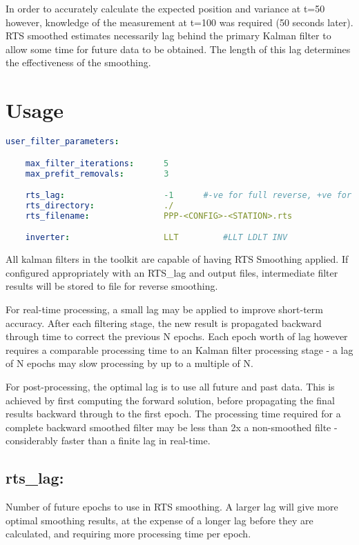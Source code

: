 In order to accurately calculate the expected position and variance at t=50 however, knowledge of the measurement at t=100 was required (50 seconds later). RTS smoothed estimates necessarily lag behind the primary Kalman filter to allow some time for future data to be obtained. The length of this lag determines the effectiveness of the smoothing.

\section{Usage}

\begin{lstlisting}[language=yaml,caption=RTS Configuration]
user_filter_parameters:

    max_filter_iterations:      5
    max_prefit_removals:        3

    rts_lag:                    -1      #-ve for full reverse, +ve for limited epochs
    rts_directory:              ./
    rts_filename:               PPP-<CONFIG>-<STATION>.rts

    inverter:                   LLT         #LLT LDLT INV

\end{lstlisting}

All kalman filters in the toolkit are capable of having RTS Smoothing applied. If configured appropriately with an RTS\_lag and output files, intermediate filter results will be stored to file for reverse smoothing.

For real-time processing, a small lag may be applied to improve short-term accuracy. After each filtering stage, the new result is propagated backward through time to correct the previous N epochs. Each epoch worth of lag however requires a comparable processing time to an Kalman filter processing stage - a lag of N epochs may slow processing by up to a multiple of N.

For post-processing, the optimal lag is to use all future and past data. This is achieved by first computing the forward solution, before propagating the final results backward through to the first epoch. The processing time required for a complete backward smoothed filter may be less than 2x a non-smoothed filte - considerably faster than a finite lag in real-time.

\subsection{rts\_lag:}
Number of future epochs to use in RTS smoothing. A larger lag will give more optimal smoothing results, at the expense of a longer lag before they are calculated, and requiring more processing time per epoch.

